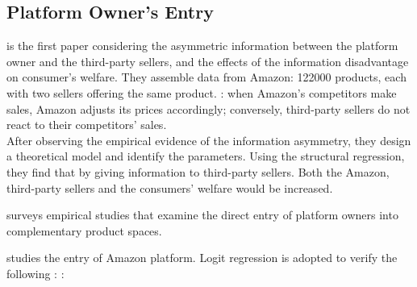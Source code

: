 \documentclass[12pt]{report}
\begin{document}
\subsection{Platform Owner's Entry}


\cite{chen2023price} is the first paper considering the asymmetric information between the platform owner and the third-party sellers, and the effects of the information disadvantage
on consumer's welfare. They assemble data from Amazon: 122000 products, each with two sellers offering the same product. : when Amazon’s competitors make sales,
Amazon adjusts its prices accordingly; conversely, third-party sellers do not react to their competitors’ sales.\\
After observing the empirical evidence of the information asymmetry, they design a theoretical model and identify the parameters. Using the structural regression, they find that by giving
information to third-party sellers. Both the Amazon, third-party sellers and the consumers' welfare would be increased.

\cite{zhu2018competing} surveys empirical studies that examine the direct entry of platform owners
into complementary product spaces.

\cite{zhu2018competing} studies the entry of Amazon platform. Logit regression is adopted to verify the following :
:
\end{document}
